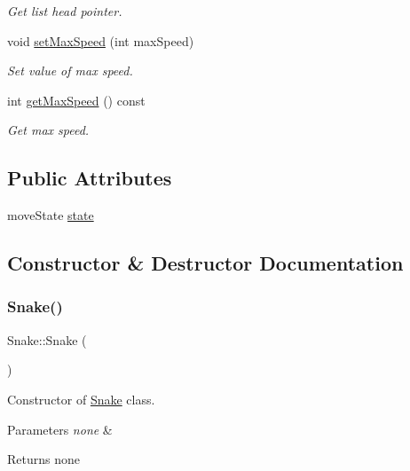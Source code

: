 \begin{DoxyCompactItemize}
\begin{DoxyCompactList}\small\item\em Get list head pointer. \end{DoxyCompactList}\item 
void \hyperlink{class_snake_a1d32911132c48ffb2cbe6752b5100405}{set\+Max\+Speed} (int max\+Speed)
\begin{DoxyCompactList}\small\item\em Set value of max speed. \end{DoxyCompactList}\item 
int \hyperlink{class_snake_ae70820c279a79caae3dcfe4cbaa4b747}{get\+Max\+Speed} () const
\begin{DoxyCompactList}\small\item\em Get max speed. \end{DoxyCompactList}\end{DoxyCompactItemize}
\subsection*{Public Attributes}
\begin{DoxyCompactItemize}
\item 
move\+State \hyperlink{class_snake_a55f2ac9d5eb97c9f86b001d47ce0e8dc}{state}
\end{DoxyCompactItemize}


\subsection{Constructor \& Destructor Documentation}
\mbox{\label{class_snake_aa9cbcdb4b25d84cbf83509039cac8d01}} 
\subsubsection{\texorpdfstring{Snake()}{Snake()}}
{\footnotesize\ttfamily Snake\+::\+Snake (\begin{DoxyParamCaption}{ }\end{DoxyParamCaption})}



Constructor of \hyperlink{class_snake}{Snake} class. 


\begin{DoxyParams}{Parameters}
{\em none} & \\
\hline
\end{DoxyParams}
\begin{DoxyReturn}{Returns}
none 
\end{DoxyReturn}


